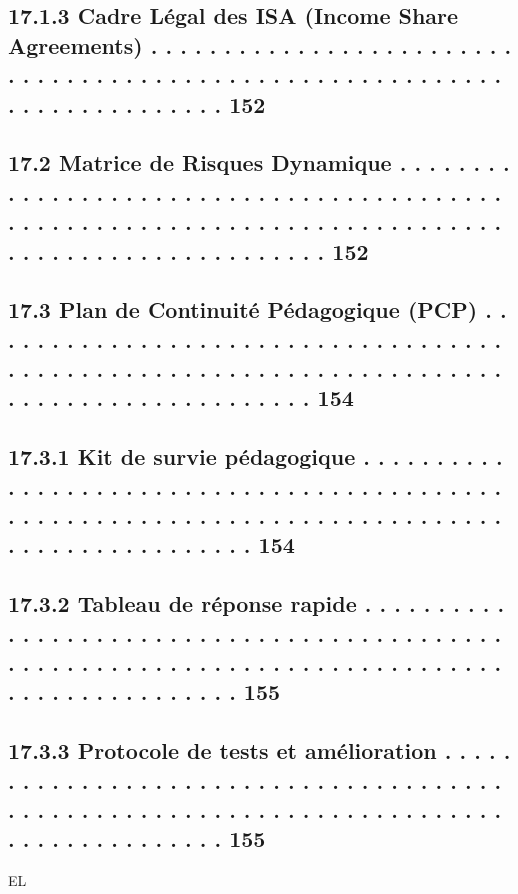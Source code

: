 \subsection{17.1.3            Cadre Légal des ISA (Income Share Agreements) . . . . . . . . . . . . . . . . . . . . . . . . . . . . . . . . . . . . . . . . . . . . . . . . . . . . . . . . . . . . . . . . . . . . . . . . . . 152}
\subsection{17.2    Matrice de Risques Dynamique . . . . . . . . . . . . . . . . . . . . . . . . . . . . . . . . . . . . . . . . . . . . . . . . . . . . . . . . . . . . . . . . . . . . . . . . . . . . . . . . . . . . . . . . . . . . . . . . . . 152}
\subsection{17.3    Plan de Continuité Pédagogique (PCP) . . . . . . . . . . . . . . . . . . . . . . . . . . . . . . . . . . . . . . . . . . . . . . . . . . . . . . . . . . . . . . . . . . . . . . . . . . . . . . . . . . . . . . . . . . . 154}
\subsection{17.3.1            Kit de survie pédagogique . . . . . . . . . . . . . . . . . . . . . . . . . . . . . . . . . . . . . . . . . . . . . . . . . . . . . . . . . . . . . . . . . . . . . . . . . . . . . . . . . . . . . . . . . . . . . . . 154}
\subsection{17.3.2            Tableau de réponse rapide . . . . . . . . . . . . . . . . . . . . . . . . . . . . . . . . . . . . . . . . . . . . . . . . . . . . . . . . . . . . . . . . . . . . . . . . . . . . . . . . . . . . . . . . . . . . . . 155}
\subsection{17.3.3            Protocole de tests et amélioration . . . . . . . . . . . . . . . . . . . . . . . . . . . . . . . . . . . . . . . . . . . . . . . . . . . . . . . . . . . . . . . . . . . . . . . . . . . . . . . . . . . . . . . . 155}
\vspace{0.5em}
\vspace{0.5em}
\vspace{0.5em}
\vspace{0.5em}
EL\\
